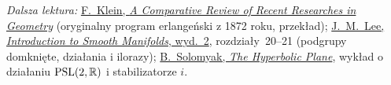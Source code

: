 \par\smallskip
{\footnotesize\noindent\emph{Dalsza lektura:}
\href{https://math.ucr.edu/home/baez/erlangen/Klein-erlangen.pdf}
{F.\ Klein, \emph{A Comparative Review of Recent Researches in Geometry}}
(oryginalny program erlangeński z 1872 roku, przekład);
\href{https://link.springer.com/book/10.1007/978-1-4419-9982-5}
{J.\ M.\ Lee, \emph{Introduction to Smooth Manifolds}, wyd.~2},
rozdziały~20--21 (podgrupy domknięte, działania i ilorazy);
\href{https://u.math.biu.ac.il/~solomyb/TEACH/21/GrAct/Lec5b.pdf}
{B.\ Solomyak, \emph{The Hyperbolic Plane}},
wykład o działaniu $\mathrm{PSL}(2,\mathbb{R})$ i stabilizatorze $i$.\par}
